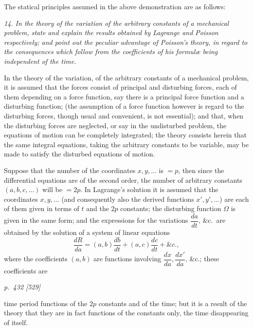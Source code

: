 \documentclass[11pt,a4paper]{book}
\begin{document}
The statical principles assumed in the above demonstration are as follows:

\textit{14. In the theory of the variation of the arbitrary constants of a mechanical problem,
state and explain the results obtained by Lagrange and Poisson respectively; and point
out the peculiar advantage of Poisson's theory, in regard to the consequences which follow
from the coefficients of his formul\ae{} being independent of the time.}

In the theory of the variation, of the arbitrary constants of a mechanical problem,
it is assumed that the forces consist of principal and disturbing forces, each of them
depending on a force function, say there is a principal force function and a disturbing
function; (the assumption of a force function however is regard to the disturbing
forces, though usual and convenient, is not essential); and that, when the disturbing
forces are neglected, or say in the undisturbed problem, the equations of motion can
be completely integrated; the theory consists herein that the same integral equations,
taking the arbitrary constants to be variable, may be made to satisfy the disturbed
equations of motion.

Suppose that the number of the coordinates $x, y, \ldots$ is $= p$, then since the differential
equations are of the second order, the number of arbitrary constants $(a, b, c, \ldots)$ will
be $= 2p$. In Lagrange's solution it is assumed that the coordinates $x, y, \ldots$ (and consequently also the derived functions $x', y', \ldots$) are each of them given in terms of $t$
and the $2p$ constants; the disturbing function $\Omega$ is given in the same form; and
the expressions for the variations $\dfrac{da}{dt}$, \&c.\ are obtained by the solution of a system of linear
equations
\[
\frac{dR}{da} = (a, b)\frac{db}{dt} + (a, c)\frac{dc}{dt} + \&c.,
\]
where the coefficients $(a, b)$ are functions involving $\dfrac{dx}{da}, \dfrac{dx'}{da}$, \&c.; these coefficients are

\clearpage

\bigskip
\textit{p.~432 [529]}
\smallskip

\noindent
time period functions of the $2p$ constants and of the time; but it is a result
of the theory that they are in fact functions of the constants only, the time disappearing of itself.
\end{document}
